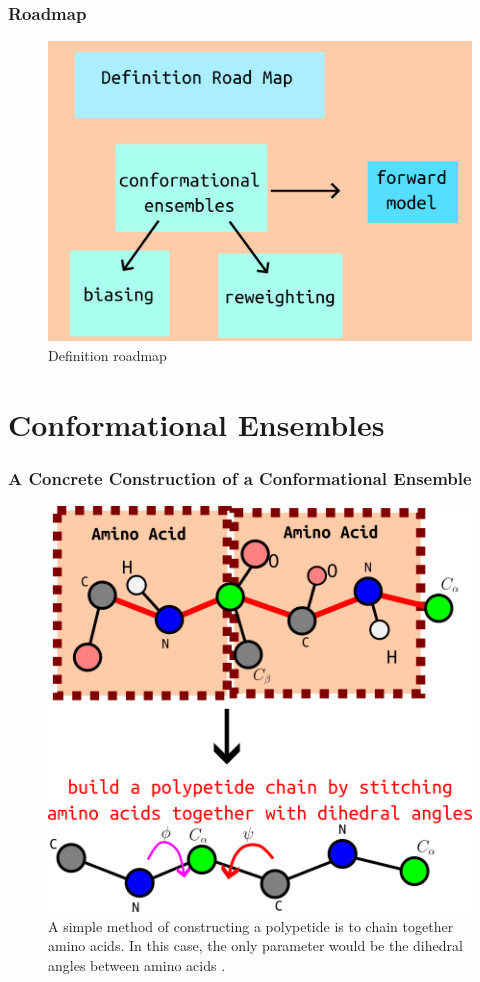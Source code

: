 \documentclass{beamer}
\begin{document}
\begin{frame}
\frametitle{Roadmap}
\begin{figure}
    \centering
    \includegraphics[scale=0.35]{roadmap.png}
    \caption{Definition roadmap}
    \label{fig:roadmap}
\end{figure}
\end{frame}

\section{Conformational Ensembles}

\begin{frame}
\frametitle{A Concrete Construction of a Conformational Ensemble}
\begin{figure}
    \centering
    \includegraphics[scale=0.6]{dihedral-angles.png}
    \caption{A simple method of constructing a polypetide is to chain together amino acids.
    In this case, the only parameter would be the dihedral angles between amino acids \cite{ozenneFlexiblemeccanoToolGeneration2012}. }
    \label{fig:dihedral-angles}
\end{figure}
\end{frame}
\end{document}
